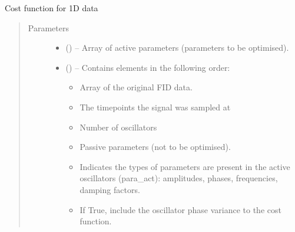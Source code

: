 \documentclass[letterpaper,10pt,english]{sphinxmanual}
\begin{document}
\begin{fulllineitems}
\label{\detokenize{references/nlp/_funcs:nmrespy.nlp._funcs.f_1d}}
\sphinxAtStartPar
Cost function for 1D data
\begin{quote}\begin{description}
\item[{Parameters}] \leavevmode\begin{itemize}
\item {} 
\sphinxAtStartPar
{} () – Array of active parameters (parameters to be optimised).

\item {} 
\sphinxAtStartPar
{} () – 
\sphinxAtStartPar
Contains elements in the following order:
\begin{itemize}
\item {} 
\sphinxAtStartPar
{}  Array of the original FID data.

\item {} 
\sphinxAtStartPar
{}  The time\sphinxhyphen{}points the signal was sampled at

\item {} 
\sphinxAtStartPar
{}  Number of oscillators

\item {} 
\sphinxAtStartPar
{}  Passive parameters (not to be
optimised).

\item {} 
\sphinxAtStartPar
{}  Indicates the types of parameters are present
in the active oscillators (para\_act):  \sphinxhyphen{} amplitudes,  \sphinxhyphen{}
phases,  \sphinxhyphen{} frequencies,  \sphinxhyphen{} damping factors.

\item {} 
\sphinxAtStartPar
{}  If True, include the oscillator phase
variance to the cost function.


\end{itemize}
\end{itemize}
\end{description}
\end{quote}
\end{fulllineitems}
\end{document}
